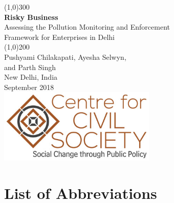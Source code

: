 \documentclass[a4paper, 12pt, twoside]{article}
\begin{document}
                    
                    \begin{titlepage}
                    \begin{center}
                    	
			\line(1,0){300}\\
                    	[0.25in]
                    	\huge{\bfseries \textcolor{CCSbrown} {Risky Business}} \\
    			[0.5cm]
    			\large  {Assessing the Pollution Monitoring and Enforcement \\ Framework  for Enterprises in Delhi} \\
                    	\line(1,0){200}\\
                    	[3in]
                    	\LARGE {Pushyami Chilakapati, Ayesha Selwyn, \\ and Parth Singh} \\ 
	                 [1.5cm]
                    	{\normalsize New Delhi, India} \\
			{\normalsize September 2018} \\
    			[1.85cm]
    			\includegraphics[width = 75mm]{CCSlogo.jpg}
      
                    \end{center}
                    \end{titlepage}

                    \tableofcontents
                    
                   \newpage
         
        \section*{List of Abbreviations}
       
\end{document}
